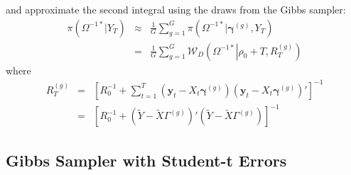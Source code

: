 \documentclass[12pt]{article}
\begin{document}
and approximate the second integral using the draws from the Gibbs sampler:
\begin{eqnarray*}
	\pi\left( \Omega^{-1*}|Y_T \right) &\approx& \frac{1}{G}\sum_{g=1}^G \pi\left( \Omega^{-1*}|\boldsymbol{\gamma}^{(g)},Y_T \right)\\
	&=& \frac{1}{G}\sum_{g=1}^G \mathcal{W}_D\left(\Omega^{-1*}\left|\rho_0 + T, R_T^{\left( g \right)}\right. \right) 
\end{eqnarray*}
where
\begin{eqnarray*}
	R_T^{(g)} &=&  \left[ R_0^{-1} + \sum_{t=1}^{T} \left( \mathbf{y}_t - X_t \boldsymbol{\gamma}^{(g)} \right)\left( \mathbf{y}_t - X_t \boldsymbol{\gamma}^{(g)} \right)' \right]^{-1}\\
	&=& \left[  R_0^{-1} + \left( \widetilde{Y} - \widetilde{X} \Gamma^{(g)} \right)'\left( \widetilde{Y} - \widetilde{X} \Gamma^{(g)} \right)\right]^{-1}
\end{eqnarray*}

\subsection{Gibbs Sampler with Student-t Errors}
\end{document}
